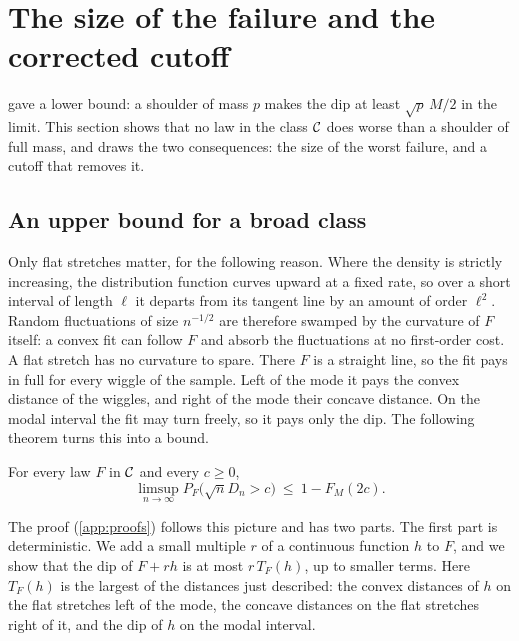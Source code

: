 \section{The size of the failure and the corrected cutoff}\label{sec:size}

 gave a lower bound: a shoulder of mass $p$ makes the dip at least $\sqrt p\,M/2$ in the limit. This section shows that no law in the class $\mathcal{C}$ does worse than a shoulder of full mass, and draws the two consequences: the size of the worst failure, and a cutoff that removes it.

\subsection{An upper bound for a broad class}
Only flat stretches matter, for the following reason. Where the density is strictly increasing, the distribution function curves upward at a fixed rate, so over a short interval of length $\ell$ it departs from its tangent line by an amount of order $\ell^2$. Random fluctuations of size $n^{-1/2}$ are therefore swamped by the curvature of $F$ itself: a convex fit can follow $F$ and absorb the fluctuations at no first-order cost. A flat stretch has no curvature to spare. There $F$ is a straight line, so the fit pays in full for every wiggle of the sample. Left of the mode it pays the convex distance of the wiggles, and right of the mode their concave distance. On the modal interval the fit may turn freely, so it pays only the dip. The following theorem turns this into a bound.

\begin{theorem}\label{thm:upper}
For every law $F$ in $\mathcal{C}$ and every $c\ge0$,
\[
\limsup_{n\to\infty}P_F\bigl(\sqrt nD_n>c\bigr)\ \le\ 1-F_M(2c).
\]
\end{theorem}

The proof (\cref{app:proofs}) follows this picture and has two parts. The first part is deterministic. We add a small multiple $r$ of a continuous function $h$ to $F$, and we show that the dip of $F+rh$ is at most $r\,T_F(h)$, up to smaller terms. Here $T_F(h)$ is the largest of the distances just described: the convex distances of $h$ on the flat stretches left of the mode, the concave distances on the flat stretches right of it, and the dip of $h$ on the modal interval.


